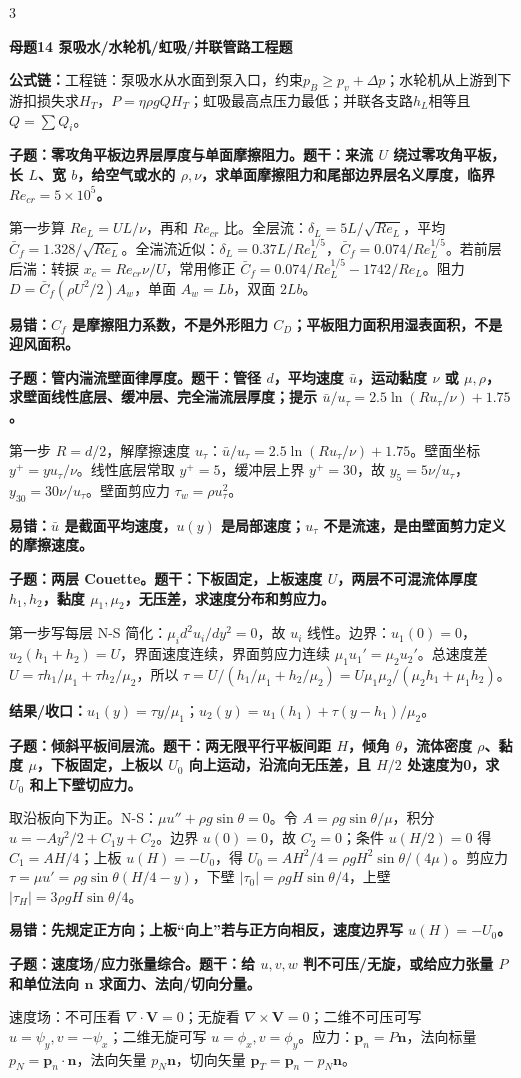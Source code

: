 \documentclass[a4paper]{article}
\newcommand{\mt}[1]{\vspace{0.12pt}\colorbox{M}{\parbox{\dimexpr\linewidth-2\fboxsep}{\color{white}\bfseries #1}}\par}
\newcommand{\qt}[1]{\vspace{0.04pt}\colorbox{Q}{\parbox{\dimexpr\linewidth-2\fboxsep}{\color{white}\bfseries #1}}\par}
\newcommand{\ans}[1]{\colorbox{G}{\parbox{\dimexpr\linewidth-2\fboxsep}{#1}}\par}
\newcommand{\warn}[1]{\colorbox{Y}{\parbox{\dimexpr\linewidth-2\fboxsep}{\color{E}\bfseries #1}}\par}
\newcommand{\res}[1]{{\color{E}\bfseries 结果/收口：}#1\par}
\newcommand{\form}[1]{{\color{M}\bfseries 公式链：}#1\par}
\begin{document}
\begin{multicols}{3}
\mt{母题14 泵吸水/水轮机/虹吸/并联管路工程题}
\form{工程链：泵吸水从水面到泵入口，约束$p_B\ge p_v+\Delta p$；水轮机从上游到下游扣损失求$H_T$，$P=\eta\rho gQH_T$；虹吸最高点压力最低；并联各支路$h_L$相等且$Q=\sum Q_i$。}
\qt{子题：零攻角平板边界层厚度与单面摩擦阻力。题干：来流 $U$ 绕过零攻角平板，长 $L$、宽 $b$，给空气或水的 $\rho,\nu$，求单面摩擦阻力和尾部边界层名义厚度，临界 $Re_{cr}=5\times10^5$。}
\ans{第一步算 $Re_L=UL/\nu$，再和 $Re_{cr}$ 比。全层流：$\delta_L=5L/\sqrt{Re_L}$，平均 $\bar C_f=1.328/\sqrt{Re_L}$。全湍流近似：$\delta_L=0.37L/Re_L^{1/5}$，$\bar C_f=0.074/Re_L^{1/5}$。若前层后湍：转捩 $x_c=Re_{cr}\nu/U$，常用修正 $\bar C_f=0.074/Re_L^{1/5}-1742/Re_L$。阻力 $D=\bar C_f(\rho U^2/2)A_w$，单面 $A_w=Lb$，双面 $2Lb$。}
\warn{易错：$C_f$ 是摩擦阻力系数，不是外形阻力 $C_D$；平板阻力面积用湿表面积，不是迎风面积。}
\qt{子题：管内湍流壁面律厚度。题干：管径 $d$，平均速度 $\bar u$，运动黏度 $\nu$ 或 $\mu,\rho$，求壁面线性底层、缓冲层、完全湍流层厚度；提示 $\bar u/u_\tau=2.5\ln(Ru_\tau/\nu)+1.75$。}
\ans{第一步 $R=d/2$，解摩擦速度 $u_\tau$：$\bar u/u_\tau=2.5\ln(Ru_\tau/\nu)+1.75$。壁面坐标 $y^+=yu_\tau/\nu$。线性底层常取 $y^+=5$，缓冲层上界 $y^+=30$，故 $y_5=5\nu/u_\tau$，$y_{30}=30\nu/u_\tau$。壁面剪应力 $\tau_w=\rho u_\tau^2$。}
\warn{易错：$\bar u$ 是截面平均速度，$u(y)$ 是局部速度；$u_\tau$ 不是流速，是由壁面剪力定义的摩擦速度。}
\qt{子题：两层 Couette。题干：下板固定，上板速度 $U$，两层不可混流体厚度 $h_1,h_2$，黏度 $\mu_1,\mu_2$，无压差，求速度分布和剪应力。}
\ans{第一步写每层 N-S 简化：$\mu_i d^2u_i/dy^2=0$，故 $u_i$ 线性。边界：$u_1(0)=0$，$u_2(h_1+h_2)=U$，界面速度连续，界面剪应力连续 $\mu_1u_1'=\mu_2u_2'$。总速度差 $U=\tau h_1/\mu_1+\tau h_2/\mu_2$，所以 $\tau=U/(h_1/\mu_1+h_2/\mu_2)=U\mu_1\mu_2/(\mu_2h_1+\mu_1h_2)$。}
\res{$u_1(y)=\tau y/\mu_1$；$u_2(y)=u_1(h_1)+\tau(y-h_1)/\mu_2$。}
\qt{子题：倾斜平板间层流。题干：两无限平行平板间距 $H$，倾角 $\theta$，流体密度 $\rho$、黏度 $\mu$，下板固定，上板以 $U_0$ 向上运动，沿流向无压差，且 $H/2$ 处速度为0，求 $U_0$ 和上下壁切应力。}
\ans{取沿板向下为正。N-S：$\mu u''+\rho g\sin\theta=0$。令 $A=\rho g\sin\theta/\mu$，积分 $u=-Ay^2/2+C_1y+C_2$。边界 $u(0)=0$，故 $C_2=0$；条件 $u(H/2)=0$ 得 $C_1=AH/4$；上板 $u(H)=-U_0$，得 $U_0=AH^2/4=\rho gH^2\sin\theta/(4\mu)$。剪应力 $\tau=\mu u'=\rho g\sin\theta(H/4-y)$，下壁 $|\tau_0|=\rho gH\sin\theta/4$，上壁 $|\tau_H|=3\rho gH\sin\theta/4$。}
\warn{易错：先规定正方向；上板“向上”若与正方向相反，速度边界写 $u(H)=-U_0$。}
\qt{子题：速度场/应力张量综合。题干：给 $u,v,w$ 判不可压/无旋，或给应力张量 $P$ 和单位法向 $\bm n$ 求面力、法向/切向分量。}
\ans{速度场：不可压看 $\nabla\cdot\bm V=0$；无旋看 $\nabla\times\bm V=0$；二维不可压可写 $u=\psi_y,v=-\psi_x$；二维无旋可写 $u=\phi_x,v=\phi_y$。应力：$\bm p_n=P\bm n$，法向标量 $p_N=\bm p_n\cdot\bm n$，法向矢量 $p_N\bm n$，切向矢量 $\bm p_T=\bm p_n-p_N\bm n$。}

\end{multicols}
\end{document}
